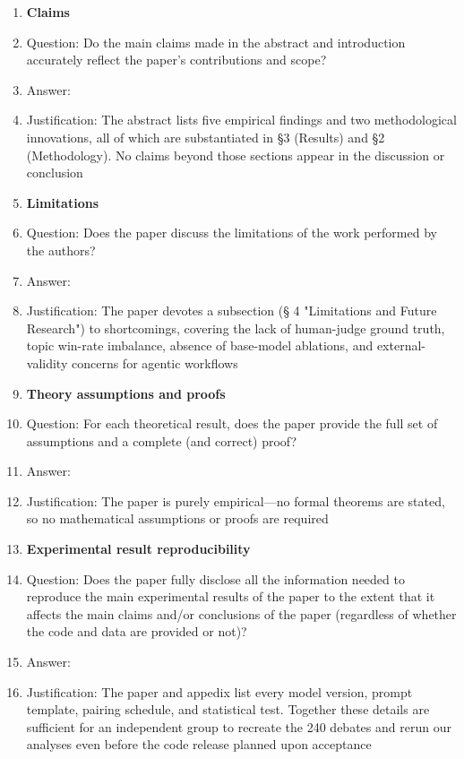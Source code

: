 \documentclass{article}
\begin{document}
\begin{enumerate}

\item {\bf Claims}
    \item[] Question: Do the main claims made in the abstract and introduction accurately reflect the paper's contributions and scope?
    \item[] Answer: \answerYes{} %
    \item[] Justification: The abstract lists five empirical findings and two methodological innovations, all of which are substantiated in §3 (Results) and §2 (Methodology). No claims beyond those sections appear in the discussion or conclusion %

\item {\bf Limitations}
    \item[] Question: Does the paper discuss the limitations of the work performed by the authors?
    \item[] Answer: \answerYes{} %
    \item[] Justification: The paper devotes a subsection (§ 4 "Limitations and Future Research") to shortcomings, covering the lack of human-judge ground truth, topic win-rate imbalance, absence of base-model ablations, and external-validity concerns for agentic workflows

\item {\bf Theory assumptions and proofs}
    \item[] Question: For each theoretical result, does the paper provide the full set of assumptions and a complete (and correct) proof?
    \item[] Answer: \answerNA{} %
    \item[] Justification: The paper is purely empirical—no formal theorems are stated, so no mathematical assumptions or proofs are required

    \item {\bf Experimental result reproducibility}
    \item[] Question: Does the paper fully disclose all the information needed to reproduce the main experimental results of the paper to the extent that it affects the main claims and/or conclusions of the paper (regardless of whether the code and data are provided or not)?
    \item[] Answer: \answerYes{} %
    \item[] Justification: The paper and appedix list every model version, prompt template, pairing schedule, and statistical test. Together these details are sufficient for an independent group to recreate the 240 debates and rerun our analyses even before the code release planned upon acceptance


\end{enumerate}
\end{document}

